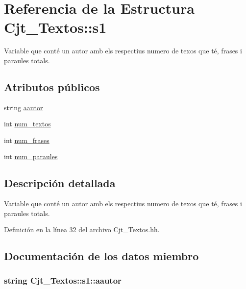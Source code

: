 \hypertarget{struct_cjt___textos_1_1s1}{}\section{Referencia de la Estructura Cjt\+\_\+\+Textos\+:\+:s1}
\label{struct_cjt___textos_1_1s1}


Variable que conté un autor amb els respectius numero de texos que té, frases i paraules totals.  


\subsection*{Atributos públicos}
\begin{DoxyCompactItemize}
\item 
string \hyperlink{struct_cjt___textos_1_1s1_a63e8996e5c436e0f30ac4b8c2a509d1b}{aautor}
\item 
int \hyperlink{struct_cjt___textos_1_1s1_a789a5da8fd97cdc9886e86f9dff2c78d}{num\+\_\+textos}
\item 
int \hyperlink{struct_cjt___textos_1_1s1_ab80e729ee8a8b08fd82b1c0bc49c3111}{num\+\_\+frases}
\item 
int \hyperlink{struct_cjt___textos_1_1s1_a38e9176fac44a1ef7e12101c0089a804}{num\+\_\+paraules}
\end{DoxyCompactItemize}


\subsection{Descripción detallada}
Variable que conté un autor amb els respectius numero de texos que té, frases i paraules totals. 

Definición en la línea 32 del archivo Cjt\+\_\+\+Textos.\+hh.



\subsection{Documentación de los datos miembro}
\subsubsection[{\texorpdfstring{aautor}{aautor}}]{\setlength{\rightskip}{0pt plus 5cm}string Cjt\+\_\+\+Textos\+::s1\+::aautor}\hypertarget{struct_cjt___textos_1_1s1_a63e8996e5c436e0f30ac4b8c2a509d1b}{}\label{struct_cjt___textos_1_1s1_a63e8996e5c436e0f30ac4b8c2a509d1b}


